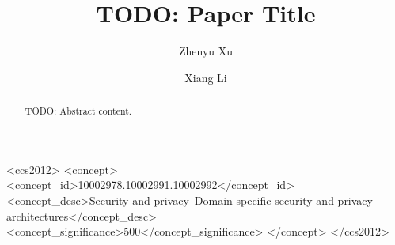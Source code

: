 \documentclass[sigconf]{acmart}
\begin{document}
\title{TODO: Paper Title}

\author{Zhenyu Xu}

\author{Xiang Li}

\renewcommand{\shortauthors}{Zhenyu Xu et al.}

\begin{abstract}
TODO: Abstract content.
\end{abstract}

\begin{CCSXML}
<ccs2012>
   <concept>
       <concept_id>10002978.10002991.10002992</concept_id>
       <concept_desc>Security and privacy~Domain-specific security and privacy architectures</concept_desc>
       <concept_significance>500</concept_significance>
   </concept>
</ccs2012>
\end{CCSXML}



\maketitle

% 


% 

% 
% 

\label{sec:methodology}



\end{document}
